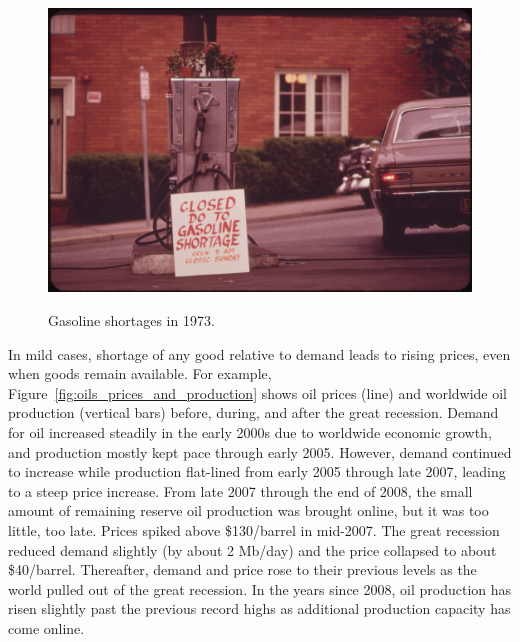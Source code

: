 \begin{figure}[!ht]
\centering\
\includegraphics[width=\linewidth]{Part_0/Chapter_Introduction/images/gas_shortage_1973.jpg}
\caption[Gasoline shortage]{Gasoline shortages in 1973.\cite{Falconer:1973aa}}
\label{fig:gas_shortage}
\end{figure}

In mild cases,
shortage of any good relative to demand leads to rising prices,
even when goods remain available.
For example,
Figure~\ref{fig:oils_prices_and_production} shows oil prices (line) and 
worldwide oil production (vertical bars) 
before, during, and after the great recession. 
Demand for oil increased steadily in the early 2000s
due to worldwide economic growth, 
and production mostly kept pace through early 2005.
However, demand continued to increase while 
production flat-lined from early 2005 through late 2007, 
leading to a steep price increase.
From late 2007 through the end of 2008, 
the small amount of remaining reserve oil production was brought online,
but it was too little, too late.
Prices spiked above \$130/barrel in mid-2007. 
The great recession reduced demand slightly (by about 2 Mb/day)
and the price collapsed to about \$40/barrel.
Thereafter, demand and price rose to their previous levels 
as the world pulled out of the great recession.
In the years since 2008, oil production has risen slightly past the previous record highs
as additional production capacity has come online.

